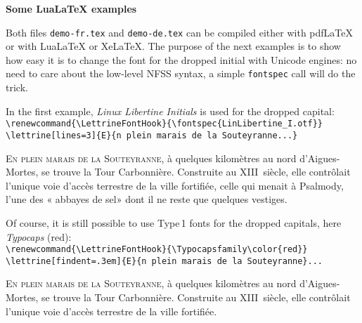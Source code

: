 \documentclass[12pt,paper=a4,german,french,british]{scrartcl}
\newcommand*{\file}[1]{\texttt{#1}}
\newcommand*{\cs}[1]{\texttt{\boi#1}}
\begin{document}
\thispagestyle{empty}
\enlargethispage{2\baselineskip}

\begin{center}
\large\bfseries Some LuaLaTeX examples
\end{center}

Both files \file{demo-fr.tex} and \file{demo-de.tex} can be compiled either with
pdfLaTeX or with LuaLaTeX or XeLaTeX. The purpose of the next examples is to
show how easy it is to change the font for the dropped initial with Unicode
engines: no need to care about the low-level NFSS syntax, a simple
\cs{fontspec} call will do the trick.

\vspace{.5\baselineskip}
In the first example, \textit{ Linux Libertine Initials} is used for the
dropped capital:\\
\verb+\renewcommand{\LettrineFontHook}{\fontspec{LinLibertine_I.otf}}+\\
\verb+\lettrine[lines=3]{E}{n plein marais de la Souteyranne...}+

\begin{fr}
  \renewcommand{\LettrineFontHook}{\fontspec{LinLibertine_I.otf}}
  \lettrine[lines=3]{E}{n plein marais de la Souteyranne}, à quelques
  kilomètres au nord d'Aigues-Mortes, se trouve la Tour Carbonnière.
  Construite au XIII\ieme~siècle, elle contrôlait l'unique voie d'accès
  terrestre de la ville fortifiée, celle qui menait à Psalmody,
  l'une des « abbayes de sel» dont il ne reste que quelques vestiges.\par
\end{fr}

\vspace{.5\baselineskip}
Of course, it is still possible to use Type\,1 fonts for the dropped capitals,
here \textit{Typocaps} (red):\\
\verb+\renewcommand{\LettrineFontHook}{\Typocapsfamily\color{red}}+\\
\verb+\lettrine[findent=.3em]{E}{n plein marais de la Souteyranne}...+

\begin{fr}
\renewcommand{\LettrineFontHook}{\Typocapsfamily\color{red}}
\lettrine[findent=.3em]{E}{n plein marais de la Souteyranne}, à quelques
kilomètres au nord d'Aigues-Mortes, se trouve la Tour Carbonnière.
Construite au XIII\ieme~siècle, elle contrôlait l'unique voie d'accès
terrestre de la ville fortifiée.\par
\end{fr}
\end{document}

